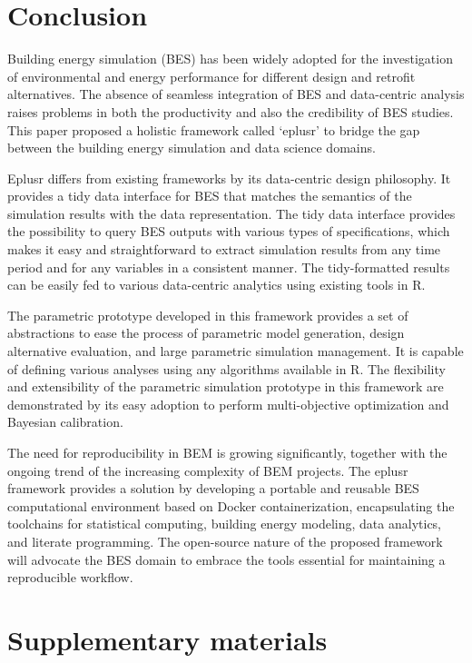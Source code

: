 \documentclass[3p, times]{elsarticle} %
\begin{document}
\hypertarget{conclusion}{%
\section{Conclusion}\label{conclusion}}

Building energy simulation (BES) has been widely adopted for the investigation of
environmental and energy performance for different design and retrofit
alternatives. The absence of seamless integration of BES and data-centric
analysis raises problems in both the productivity and also the credibility of
BES studies. This paper proposed a holistic framework called `eplusr' to
bridge the gap between the building energy simulation and data science domains.

Eplusr differs from existing frameworks by its data-centric design philosophy.
It provides a tidy data interface for BES that matches the semantics of the
simulation results with the data representation. The tidy data interface
provides the possibility to query BES outputs with various types of
specifications, which makes it easy and straightforward to extract simulation
results from any time period and for any variables in a consistent manner. The
tidy-formatted results can be easily fed to various data-centric analytics
using existing tools in R.

The parametric prototype developed in this framework provides a set of
abstractions to ease the process of parametric model generation, design
alternative evaluation, and large parametric simulation management. It is
capable of defining various analyses using any algorithms available in R. The
flexibility and extensibility of the parametric simulation prototype in this
framework are demonstrated by its easy adoption to perform multi-objective
optimization and Bayesian calibration.

The need for reproducibility in BEM is growing significantly, together with the
ongoing trend of the increasing complexity of BEM projects. The eplusr framework
provides a solution by developing a portable and reusable BES
computational environment based on Docker containerization, encapsulating the
toolchains for statistical computing, building energy modeling, data analytics,
and literate programming. The open-source nature of the proposed framework will
advocate the BES domain to embrace the tools essential for maintaining a
reproducible workflow.

\hypertarget{supplementary-materials}{%
\section*{Supplementary materials}\label{supplementary-materials}}
\end{document}
